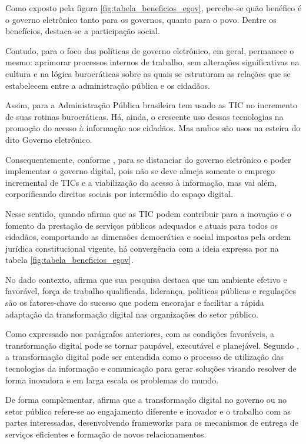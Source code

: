 Como exposto pela figura \ref{fig:tabela_beneficios_egov}, percebe-se quão benéfico é o governo eletrônico tanto para os governos, quanto para o povo. Dentre os benefícios, destaca-se a participação social. 

Contudo, para \cite{de2020governo} o foco das políticas de governo eletrônico, em geral, permanece o mesmo: aprimorar processos internos de  trabalho, sem alterações significativas na cultura e na lógica burocráticas sobre as quais se estruturam as relações que se estabelecem entre a administração pública e os cidadãos.

Assim, para \cite{cristovam2020governo} a Administração Pública brasileira tem usado as TIC no incremento de suas rotinas burocráticas. Há, ainda, o crescente uso dessas tecnologias na promoção do acesso à informação aos cidadãos. Mas ambos são usos na esteira do dito Governo eletrônico.

Consequentemente, conforme \cite{cristovam2020governo}, para se distanciar do governo eletrônico e poder implementar o governo digital, pois não se deve almeja somente o emprego incremental de TICs e a viabilização do acesso à informação, mas vai além, corporificando direitos sociais por intermédio do espaço digital.

Nesse sentido, quando \cite{cristovam2020governo} afirma que as TIC podem contribuir para a inovação e o fomento da prestação de serviços públicos adequados e atuais para todos os cidadãos, comportando as dimensões democrática e social impostas pela ordem jurídica constitucional vigente, há convergência com a ideia expressa por \cite{kotenok2020government} na tabela \ref{fig:tabela_beneficios_egov}.

No dado contexto, \cite{alenezi2022understanding} afirma que sua pesquisa destaca que um ambiente efetivo e favorável, força de trabalho qualificada, liderança, políticas públicas e regulações são os fatores-chave do sucesso que podem encorajar e facilitar a rápida adaptação da transformação digital nas organizações do setor público.

Como expressado nos parágrafos anteriores, com as condições favoráveis, a transformação digital pode se tornar paupável, executável e planejável. Segundo \cite{mitkiewicz2024transformacao}, a transformação digital pode ser entendida como o processo de utilização das tecnologias da informação e comunicação para gerar soluções visando resolver de forma inovadora e em larga escala os problemas do mundo.

De forma complementar, \cite{alenezi2022understanding} afirma que a transformação digital no governo ou no setor público refere-se ao engajamento diferente e inovador e o trabalho com as partes interessadas, desenvolvendo frameworks para os mecanismos de entrega de serviços eficientes e formação de novos relacionamentos.


